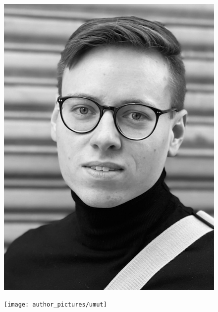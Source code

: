 \documentclass[10pt, a4paper,onecolumn ,titlepage]{article}
\begin{document}
\begin{titlepage}
\begin{center}
            \begin{figure}[H]
                \centering
                \begin{minipage}[b]{.13\linewidth} %
                    \includegraphics[width=\linewidth]{author_pictures/chris_2}
                \end{minipage}\label{fig:chris}
                \hspace{.005\linewidth}%
                \begin{minipage}[b]{.13\linewidth} %
                    \texttt{[image: author\_pictures/umut]}
                \end{minipage}\label{fig:umut}
                \hspace{.005\linewidth}%
                \begin{minipage}[b]{.13\linewidth} %

\end{minipage}
\end{figure}
\end{center}
\end{titlepage}
\end{document}
